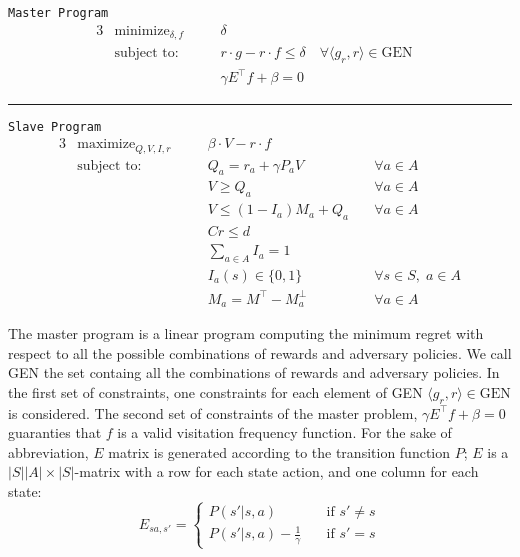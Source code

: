 \documentclass[runningheads,a4paper]{llncs}
\begin{document}
\begin{center}\label{minimax}
\texttt{Master Program}
\begin{alignat}{3}
&\text{minimize}_{\delta, f} && \delta & \\
&\text{subject to:}&\quad& r\cdot g - r \cdot f \leq \delta \quad \forall \langle g_r, r \rangle \in \text{GEN}\label{delta_cut}\\
&& \quad& \gamma E^{\top} f + \beta = 0 
\end{alignat}
\begin{center}
\noindent\rule{8cm}{0.4pt}
\end{center} 
\texttt{Slave Program}
\begin{alignat}{3}
&\text{maximize}_{Q, V, I, r} && \beta \cdot V - r \cdot f \\
&\text{subject to:} &\quad& Q_a = r_a + \gamma P_aV &\quad \forall a \in A\\
&& \quad& V \geq Q_a  &\quad \forall a \in A\\
&& \quad& V \leq (1-I_a)M_a + Q_a  &\quad \forall a \in A\\
&& \quad& Cr \leq d \\
&& \quad& \sum_{a \in A} I_a = 1  \label{eq:sum_I}\\
&& \quad& I_a(s) \in \{0, 1 \} &\quad \forall s \in S, \; a \in A \label{eq:bin_I}\\
&& \quad& M_a = M^{\top} - M_a^{\perp} &\quad \forall a \in A
\end{alignat}
\end{center}

The master program is a linear program computing the minimum regret with respect to all the possible combinations of rewards and adversary policies. We call GEN the set containg all the combinations of rewards and adversary policies. 
In the first set of constraints, one constraints for each element of GEN $\langle g_r, r \rangle \in \text{GEN}$ is considered. 
The second set of constraints of the master problem, $\gamma E ^{\top}f+ \beta = 0$ guaranties that $f$ is a valid visitation frequency function. For the sake of abbreviation, $E$ matrix is generated according to the transition function $P$; $E$ is a $|S||A| \times |S|$-matrix with a row for each state action, and one column for each state:
\[   
E_{sa,s'} = 
     \begin{cases}
       P(s'|s, a) &\quad \text{if } s' \neq s\\
       P(s'|s, a) - \frac{1}{\gamma} &\quad \text{if } s' = s
     \end{cases}
\] 
\end{document}
